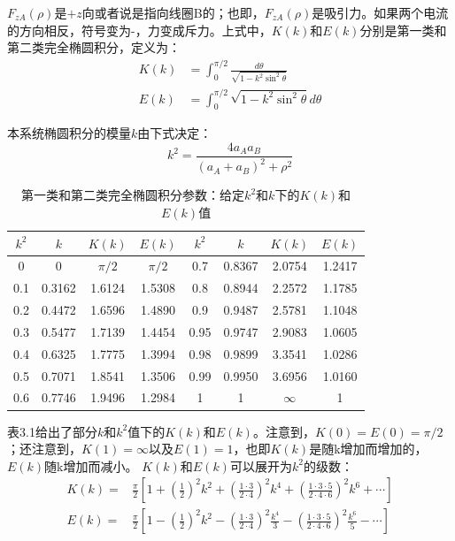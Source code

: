 $F_{zA}(\rho)$是$+z$向或者说是指向线圈B的；也即，$F_{zA}(\rho)$是吸引力。如果两个电流的方向相反，符号变为-，力变成斥力。上式中，$K(k)$和$E(k)$分别是第一类和第二类完全椭圆积分，定义为：
\begin{subequations}
	\begin{align}
  K(k) &= \int_{0}^{\pi/2} \frac{d\theta}{\sqrt{1-k^2\sin^2\theta}} \\
  E(k)&= \int_{0}^{\pi/2}\sqrt{1-k^2 \sin^2\theta}d\theta
  \end{align}
\end{subequations}

本系统椭圆积分的模量$k$由下式决定：
\begin{equation}
  k^2=\frac{4a_A a_B}{(a_A+a_B)^2+\rho^2}
\end{equation}



\begin{table}[htbp]\small
\centering
\caption{第一类和第二类完全椭圆积分参数：给定$k^2$和$k$下的$K(k)$和$E(k)$值}
\label{my-label}
\begin{tabular}{|c|c||c|c||c|c||c|c|}
\hline
$k^2$    & $k$  & $K(k)$ &$E(k)$  &$k^2$  & $k$ &$K(k)$  &$E(k)$  \\ \hline\hline
0   & 0 &$\pi/2$  & $\pi/2$ &0.7&0.8367  &2.0754  & 1.2417 \\ 
0.1 & 0.3162  & 1.6124 &1.5308  &0.8& 0.8944 & 2.2572 & 1.1785 \\ 
0.2 & 0.4472  & 1.6596 &1.4890  &0.9&0.9487  & 2.5781 & 1.1048 \\ 
0.3 & 0.5477  & 1.7139 & 1.4454 &0.95&0.9747  &2.9083  & 1.0605 \\
0.4 & 0.6325  & 1.7775 &1.3994  &0.98& 0.9899 & 3.3541 & 1.0286 \\ 
0.5 & 0.7071  & 1.8541 &1.3506  & 0.99& 0.9950 &3.6956  & 1.0160 \\ 
0.6 & 0.7746  & 1.9496 &1.2984  &1  &1  &$\infty$  &  1\\ \hline
\end{tabular}
\end{table}

表3.1给出了部分$k$和$k^2$值下的$K(k)$和$E(k)$。注意到，$K(0)=E(0)=\pi/2$；还注意到，$K(1)=\infty$以及$E(1)=1$，也即$K(k)$是随k增加而增加的，$E(k)$随k增加而减小。
$K(k)$和$E(k)$可以展开为$k^2$的级数：
\begin{subequations}
	\begin{align}
  K(k) =& \frac{\pi}{2}[1+(\frac{1}{2})^2 k^2+(\frac{1\cdot 3}{2\cdot 4})^2 k^4+(\frac{1\cdot 3\cdot 5}{2\cdot 4\cdot 6})^2 k^6+\cdots] \\
  E(k) =& \frac{\pi}{2}[1-(\frac{1}{2})^2 k^2-(\frac{1\cdot 3}{2\cdot 4})^2 \frac{k^4}{3}-(\frac{1\cdot 3\cdot 5}{2\cdot 4\cdot 6})^2 \frac{k^6}{5}-\cdots]
 	\end{align}
  \end{subequations}


